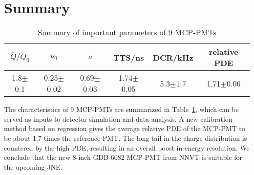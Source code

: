 \section{Summary}
\label{Summary}
\begin{table}
    \centering
    \caption{Summary of important parameters of 9 MCP-PMTs}
    \label{tab:summary}
    \begin{tabular}{|c|c|c|c|c|c|}
        \hline
        $\overline{Q}/Q_0$&$\nu_0$&$\nu$&TTS/ns&DCR/kHz&relative PDE\\
        \hline
        1.8$\pm$0.1&0.25$\pm$0.02&0.69$\pm$0.03&1.74$\pm$0.05&5.3$\pm$1.7&1.71$\pm$0.06\\
        \hline
    \end{tabular}
\end{table}

The characteristics of 9 MCP-PMTs are summarized in Table~\ref{tab:summary}, which can be served as inputs to detector simulation and data analysis. A new calibration method based on regression gives the average relative PDE of the MCP-PMT to be about 1.7 times the reference PMT. The long tail in the charge distribution is countered by the high PDE, resulting in an overall boost in energy resolution. We conclude that the new 8-inch GDB-6082 MCP-PMT from NNVT is suitable for the upcoming JNE.